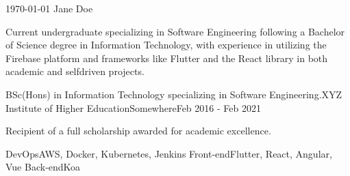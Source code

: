 \documentclass[11pt, a4paper]{awesome-cv}
\begin{document}
\makecvheader[C]

\makecvfooter
  {\today}
  {Jane Doe}
  {\thepage}


        \begin{cvparagraph}

        Current undergraduate specializing in Software Engineering following a Bachelor of Science degree in Information Technology, with experience in utilizing the Firebase platform and frameworks like Flutter and the React library in both academic and selfdriven projects.
        \end{cvparagraph}

        

        \begin{cventries}

        
                  \cventry
                {BSc(Hons) in Information Technology specializing in Software Engineering.}{XYZ Institute of Higher Education}{Somewhere}{Feb 2016 - Feb 2021}
                        {
                          \begin{cvitems}
                            \item{Recipient of a full scholarship awarded for academic excellence.}
                          \end{cvitems}
                        }
        \end{cventries}

        

        \begin{cvskills}

        
                  \cvskill
                {DevOps}{AWS, Docker, Kubernetes, Jenkins}
                  \cvskill
                {Front-end}{Flutter, React, Angular, Vue}
                  \cvskill
                {Back-end}{Koa}
        \end{cvskills}

        
\end{document}
